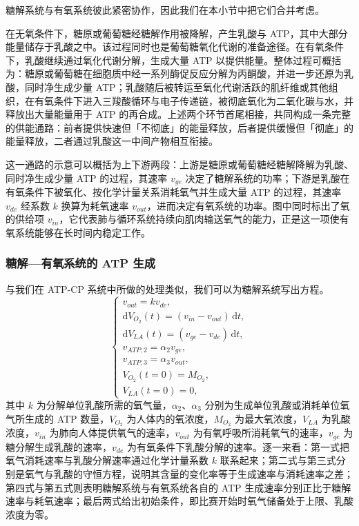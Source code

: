 \documentclass[11pt,a4paper]{ctexart}
\begin{document}
糖解系统与有氧系统彼此紧密协作，因此我们在本小节中把它们合并考虑。

在无氧条件下，糖原或葡萄糖经糖解作用被降解，产生乳酸与 ATP，其中大部分能量储存于乳酸之中。该过程同时也是葡萄糖氧化代谢的准备途径。在有氧条件下，乳酸继续通过氧化代谢分解，生成大量 ATP 以提供能量。整体过程可概括为：糖原或葡萄糖在细胞质中经一系列酶促反应分解为丙酮酸，并进一步还原为乳酸，同时净生成少量 ATP；乳酸随后被转运至氧化代谢活跃的肌纤维或其他组织，在有氧条件下进入三羧酸循环与电子传递链，被彻底氧化为二氧化碳与水，并释放出大量能量用于 ATP 的再合成。上述两个环节首尾相接，共同构成一条完整的供能通路：前者提供快速但「不彻底」的能量释放，后者提供缓慢但「彻底」的能量释放，二者通过乳酸这一中间产物相互衔接。

这一通路的示意可以概括为上下游两段：上游是糖原或葡萄糖经糖解降解为乳酸、同时净生成少量 ATP 的过程，其速率 $v_{ge}$ 决定了糖解系统的功率；下游是乳酸在有氧条件下被氧化、按化学计量关系消耗氧气并生成大量 ATP 的过程，其速率 $v_{de}$ 经系数 $k$ 换算为耗氧速率 $v_{out}$，进而决定有氧系统的功率。图中同时标出了氧的供给项 $v_{in}$，它代表肺与循环系统持续向肌肉输送氧气的能力，正是这一项使有氧系统能够在长时间内稳定工作。

\subsubsection{糖解—有氧系统的 ATP 生成}

与我们在 ATP-CP 系统中所做的处理类似，我们可以为糖解系统写出方程。
\begin{equation}
\begin{cases}
v_{out}=k v_{de},\\[0.3em]
\mathrm{d}V_{O_2}(t)=(v_{in}-v_{out})\,\mathrm{d}t,\\[0.3em]
\mathrm{d}V_{LA}(t)=(v_{ge}-v_{de})\,\mathrm{d}t,\\[0.3em]
v_{ATP,2}=\alpha_2 v_{ge},\\[0.3em]
v_{ATP,3}=\alpha_3 v_{out},\\[0.3em]
V_{O_2}(t=0)=M_{O_2},\\[0.3em]
V_{LA}(t=0)=0,
\end{cases}
\end{equation}
其中 $k$ 为分解单位乳酸所需的氧气量，$\alpha_2$、$\alpha_3$ 分别为生成单位乳酸或消耗单位氧气所生成的 ATP 数量，$V_{O_2}$ 为人体内的氧浓度，$M_{O_2}$ 为最大氧浓度，$V_{LA}$ 为乳酸浓度，$v_{in}$ 为肺向人体提供氧气的速率，$v_{out}$ 为有氧呼吸所消耗氧气的速率，$v_{ge}$ 为糖分解生成乳酸的速率，$v_{de}$ 为有氧条件下乳酸分解的速率。逐一来看：第一式把氧气消耗速率与乳酸分解速率通过化学计量系数 $k$ 联系起来；第二式与第三式分别是氧气与乳酸的守恒方程，说明其含量的变化率等于生成速率与消耗速率之差；第四式与第五式则表明糖解系统与有氧系统各自的 ATP 生成速率分别正比于糖解速率与耗氧速率；最后两式给出初始条件，即比赛开始时氧气储备处于上限、乳酸浓度为零。
\end{document}
